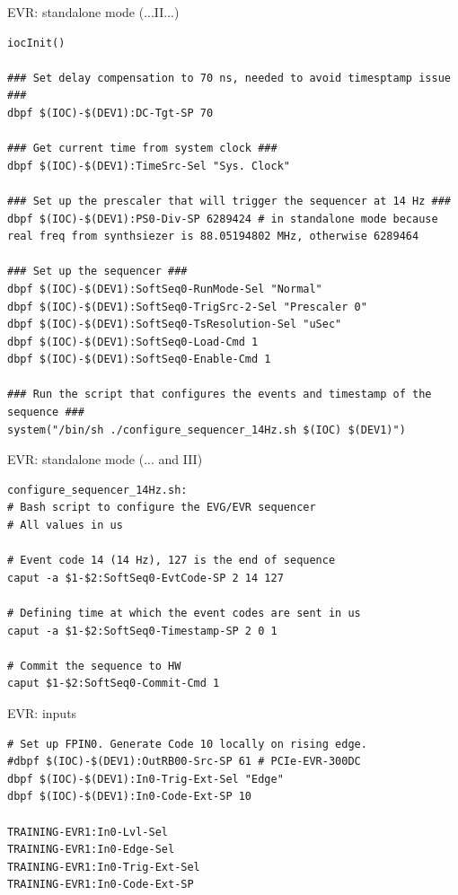 \documentclass[
  9pt
  , table
  , ignorenonframetext
]{beamer}
\begin{document}
\begin{frame}[fragile]{EVR: standalone mode (...II...)}
\begin{lstlisting}[style=termstyle,breaklines=true,basicstyle=\scriptsize]
iocInit()

### Set delay compensation to 70 ns, needed to avoid timesptamp issue ###
dbpf $(IOC)-$(DEV1):DC-Tgt-SP 70

### Get current time from system clock ###
dbpf $(IOC)-$(DEV1):TimeSrc-Sel "Sys. Clock"

### Set up the prescaler that will trigger the sequencer at 14 Hz ###
dbpf $(IOC)-$(DEV1):PS0-Div-SP 6289424 # in standalone mode because real freq from synthsiezer is 88.05194802 MHz, otherwise 6289464

### Set up the sequencer ###
dbpf $(IOC)-$(DEV1):SoftSeq0-RunMode-Sel "Normal"
dbpf $(IOC)-$(DEV1):SoftSeq0-TrigSrc-2-Sel "Prescaler 0"
dbpf $(IOC)-$(DEV1):SoftSeq0-TsResolution-Sel "uSec"
dbpf $(IOC)-$(DEV1):SoftSeq0-Load-Cmd 1
dbpf $(IOC)-$(DEV1):SoftSeq0-Enable-Cmd 1

### Run the script that configures the events and timestamp of the sequence ###
system("/bin/sh ./configure_sequencer_14Hz.sh $(IOC) $(DEV1)")

\end{lstlisting}
\end{frame}

\begin{frame}[fragile]{EVR: standalone mode (... and III)}
\begin{lstlisting}[style=termstyle,breaklines=true,basicstyle=\scriptsize]
configure_sequencer_14Hz.sh:
# Bash script to configure the EVG/EVR sequencer
# All values in us

# Event code 14 (14 Hz), 127 is the end of sequence
caput -a $1-$2:SoftSeq0-EvtCode-SP 2 14 127

# Defining time at which the event codes are sent in us
caput -a $1-$2:SoftSeq0-Timestamp-SP 2 0 1

# Commit the sequence to HW
caput $1-$2:SoftSeq0-Commit-Cmd 1

\end{lstlisting}
\end{frame}

\begin{frame}[fragile]{EVR: inputs}
\begin{lstlisting}[style=termstyle,breaklines=true,basicstyle=\scriptsize]
# Set up FPIN0. Generate Code 10 locally on rising edge.
#dbpf $(IOC)-$(DEV1):OutRB00-Src-SP 61 # PCIe-EVR-300DC
dbpf $(IOC)-$(DEV1):In0-Trig-Ext-Sel "Edge"
dbpf $(IOC)-$(DEV1):In0-Code-Ext-SP 10

TRAINING-EVR1:In0-Lvl-Sel
TRAINING-EVR1:In0-Edge-Sel
TRAINING-EVR1:In0-Trig-Ext-Sel
TRAINING-EVR1:In0-Code-Ext-SP

\end{lstlisting}
\end{frame}
\end{document}
